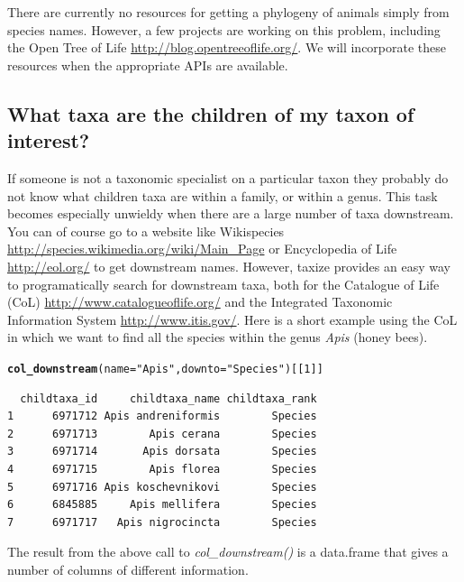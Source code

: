 \documentclass[10pt,a4paper,twocolumn]{article}
\makeatletter
\newcommand{\hlfunctioncall}[1]{\textcolor[rgb]{0.501960784313725,0,0.329411764705882}{\textbf{#1}}}%
\newcommand{\hlstring}[1]{\textcolor[rgb]{0.6,0.6,1}{#1}}%
\newenvironment{kframe}{%
 \def\at@end@of@kframe{}%
 \ifinner\ifhmode%
  \def\at@end@of@kframe{\end{minipage}}%
  \begin{minipage}{\columnwidth}%
 \fi\fi%
 \def\FrameCommand##1{\hskip\@totalleftmargin \hskip-\fboxsep
 \colorbox{shadecolor}{##1}\hskip-\fboxsep
     \hskip-\linewidth \hskip-\@totalleftmargin \hskip\columnwidth}%
 \MakeFramed {\advance\hsize-\width
   \@totalleftmargin\z@ \linewidth\hsize
   \@setminipage}}%
 {\par\unskip\endMakeFramed%
 \at@end@of@kframe}
\newenvironment{knitrout}{}{} %
\makeatother
\begin{document}
There are currently no resources for getting a phylogeny of animals simply from species names. However, a few projects are working on this problem, including the Open Tree of Life \url{http://blog.opentreeoflife.org/}. We will incorporate these resources when the appropriate APIs are available.


\subsection*{What taxa are the children of my taxon of interest?}

If someone is not a taxonomic specialist on a particular taxon they probably do not know what children taxa are within a family, or within a genus. This task becomes especially unwieldy when there are a large number of taxa downstream. You can of course go to a website like Wikispecies \url{http://species.wikimedia.org/wiki/Main_Page} or Encyclopedia of Life \url{http://eol.org/} to get downstream names. However, taxize provides an easy way to programatically search for downstream taxa, both for the Catalogue of Life (CoL) \url{http://www.catalogueoflife.org/} and the Integrated Taxonomic Information System \url{http://www.itis.gov/}. Here is a short example using the CoL in which we want to find all the species within the genus \emph{Apis} (honey bees).


\begin{knitrout}
\begin{scriptsize}
\color{fgcolor}\begin{kframe}
\begin{alltt}
\hlfunctioncall{col_downstream}(name = \hlstring{"Apis"}, downto = \hlstring{"Species"})[[1]]
\end{alltt}
\begin{verbatim}
  childtaxa_id     childtaxa_name childtaxa_rank
1      6971712 Apis andreniformis        Species
2      6971713        Apis cerana        Species
3      6971714       Apis dorsata        Species
4      6971715        Apis florea        Species
5      6971716 Apis koschevnikovi        Species
6      6845885     Apis mellifera        Species
7      6971717   Apis nigrocincta        Species
\end{verbatim}
\end{kframe}
\end{scriptsize}
\end{knitrout}


The result from the above call to \emph{col\_downstream()} is a data.frame that gives a number of columns of different information. 
\end{document}
